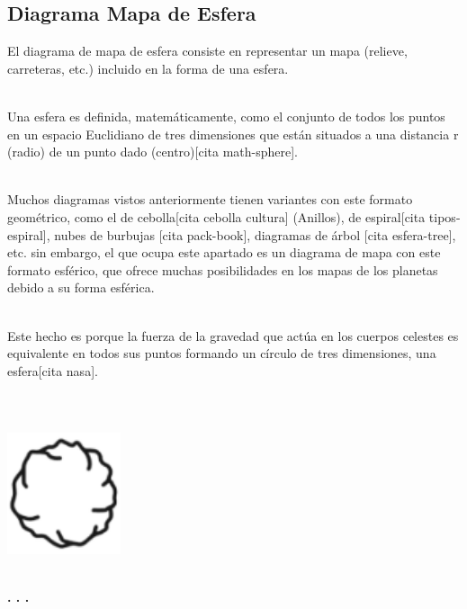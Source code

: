 \documentclass{article}\usepackage[]{graphicx}\usepackage[]{color}
\begin{document}
\subsection{Diagrama Mapa de Esfera}
El diagrama de mapa de esfera consiste en representar un mapa (relieve, carreteras, etc.) incluido en la forma de una esfera.~\\~\par
Una esfera es definida, matem\'aticamente, como el conjunto de todos los puntos en un espacio Euclidiano de tres dimensiones que est\'an situados a una distancia r (radio) de un punto dado (centro)[cita math-sphere].~\\~\par
Muchos diagramas vistos anteriormente tienen variantes con este formato geom\'etrico, como el de cebolla[cita cebolla cultura] (Anillos), de espiral[cita tipos-espiral], nubes de burbujas [cita pack-book], diagramas de \'arbol [cita esfera-tree], etc. sin embargo, el que ocupa este apartado es un diagrama de mapa con este formato esf\'erico, que ofrece muchas posibilidades en los mapas de los planetas debido a su forma esf\'erica.~\\~\par
Este hecho es porque la fuerza de la gravedad que act\'ua en los cuerpos celestes es equivalente en todos sus puntos formando un c\'irculo de tres dimensiones, una esfera[cita nasa]. 
~\\~\\~\\~\\
\vbox{
    \centering
    \includegraphics[width=0.25\textwidth]{imag/esferas}
}
~\\~\\
\begin{center}
\textbf{. . .}
\end{center}
~\\~\\~\\
\end{document}
